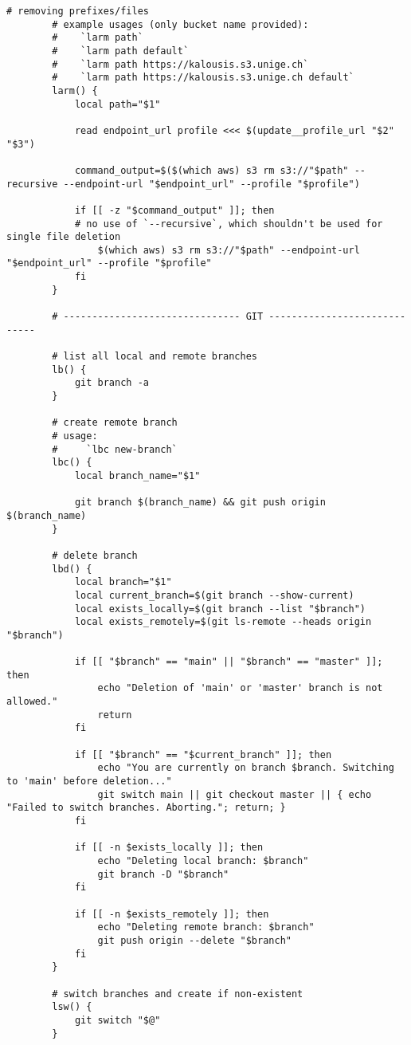 \documentclass[12pt, a4paper]{scrbook}
\numberwithin{equation}{section}
\theoremstyle{definition}
\theoremstyle{definition}
\begin{document}
\begin{lstlisting}[style=mystylebash, label=alg:bashrc_contents, xleftmargin=\parindent]
		# removing prefixes/files
		# example usages (only bucket name provided):
		#    `larm path`
		#    `larm path default`
		#    `larm path https://kalousis.s3.unige.ch`
		#    `larm path https://kalousis.s3.unige.ch default`
		larm() {
			local path="$1"
			
			read endpoint_url profile <<< $(update__profile_url "$2" "$3")
			
			command_output=$($(which aws) s3 rm s3://"$path" --recursive --endpoint-url "$endpoint_url" --profile "$profile")
			
			if [[ -z "$command_output" ]]; then
			# no use of `--recursive`, which shouldn't be used for single file deletion
				$(which aws) s3 rm s3://"$path" --endpoint-url "$endpoint_url" --profile "$profile"
			fi
		}
		
		# ------------------------------- GIT -----------------------------
		
		# list all local and remote branches
		lb() {
			git branch -a
		}
		
		# create remote branch
		# usage:
		#     `lbc new-branch`
		lbc() {
			local branch_name="$1"

			git branch $(branch_name) && git push origin $(branch_name)
		}
		
		# delete branch
		lbd() {
			local branch="$1"
			local current_branch=$(git branch --show-current)
			local exists_locally=$(git branch --list "$branch")
			local exists_remotely=$(git ls-remote --heads origin "$branch")
			
			if [[ "$branch" == "main" || "$branch" == "master" ]]; then
				echo "Deletion of 'main' or 'master' branch is not allowed."
				return
			fi
			
			if [[ "$branch" == "$current_branch" ]]; then
				echo "You are currently on branch $branch. Switching to 'main' before deletion..."
				git switch main || git checkout master || { echo "Failed to switch branches. Aborting."; return; }
			fi
			
			if [[ -n $exists_locally ]]; then
				echo "Deleting local branch: $branch"
				git branch -D "$branch"
			fi
			
			if [[ -n $exists_remotely ]]; then
				echo "Deleting remote branch: $branch"
				git push origin --delete "$branch"
			fi
		}
		
		# switch branches and create if non-existent
		lsw() {                                                                                                           
			git switch "$@"
		}
	

\end{lstlisting}
\end{document}
